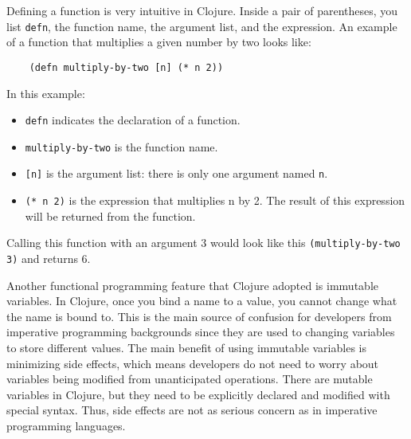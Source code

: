 \documentclass[12pt]{article}
\newcommand{\comment}[1]{{\bf \tt  {#1}}}
\newcommand{\emcomment}[1]{\textcolor{ForestGreen}{\comment{Elena: {#1}}}}
\newcommand{\tscomment}[1]{\textcolor{Teal}{\comment{Tony: {#1}}}}
\begin{document}
	Defining a function is very intuitive in Clojure. Inside a pair of parentheses, you list \texttt{defn}, the function name, 
	the argument list, and the expression.
	An example of a function that multiplies a given number by two looks like:
	\begin{verbatim}
	(defn multiply-by-two [n] (* n 2))
	\end{verbatim}
	In this example:
	\begin{itemize}
	\item {\tt defn} indicates the declaration of a function.
	\item {\tt multiply-by-two} is the function name.
	\item \texttt{[n]} is the argument list: there is only one argument named {\tt n}.
	\item {\tt (* n 2)} is the expression that multiplies n by 2. The result of this expression will be returned from the function. 
	\end{itemize}
	Calling this function with an argument 3 would look like this {\tt (multiply-by-two 3)} and returns 6.
	
	Another functional programming feature that Clojure adopted is immutable variables. In Clojure, once you bind a 
	name to a value, you cannot change what the name is bound to.
	This is the main source of confusion for developers from imperative programming backgrounds since they are used to 
	changing variables to store different values.
	The main benefit of using immutable variables is minimizing side effects, which means 
	developers do not need to worry about variables being modified from unanticipated operations. 
	There are mutable variables in Clojure, but they need to be explicitly declared and modified with special syntax.
	Thus, side effects are not as serious concern as in imperative programming languages. 
	
\end{document}
